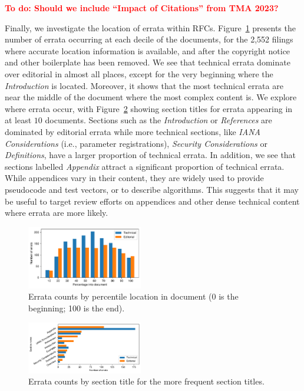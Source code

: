 \documentclass[twocolumn,10pt]{article}
\newcommand{\todo}[1]{\textbf{\textcolor{red}{To do: #1}}}
\newcommand{\pb}[1]{\vspace{0.75ex}\noindent{\textbf{#1}}}
\begin{document}
\todo{Should we include ``Impact of Citations'' from TMA 2023?}

\pb{Errata Location:}
Finally, we investigate the location of errata within RFCs.
Figure~\ref{fig:errata_location_percent_count} presents the number of
errata occurring at each decile of the documents, for the 2,552 filings
where accurate location information is available, and after the copyright
notice and other boilerplate has been removed.  We see that technical
errata dominate over editorial in almost all places, except for the very
beginning where the \textit{Introduction} is located. Moreover, it shows
that the most technical errata are near the middle of the document where
the most complex content is.  We explore where errata occur, with
Figure~\ref{fig:errata_section_wise_counts} showing section titles for
errata appearing in at least $10$ documents. Sections such as the
\emph{Introduction} or \textit{References} are dominated by editorial
errata while more technical sections, like \emph{IANA Considerations} (i.e.,
parameter registrations), \emph{Security Considerations} or
\emph{Definitions}, have a larger proportion of technical errata. In
addition, we see that sections labelled \emph{Appendix} attract a
significant proportion of technical errata. While appendices vary in their
content, they are widely used to provide pseudocode and test vectors, or to
describe algorithms. This suggests that it may be useful to target review
efforts on appendices and other dense technical content where errata are
more likely.

\begin{figure}
\includegraphics[width=0.45\textwidth]{figures-prev/tma-2023/location-percent.pdf}
\caption{Errata counts by percentile location in document (0 is the beginning; 100 is the end).}
\label{fig:errata_location_percent_count}
\end{figure}

\begin{figure}
\includegraphics[width=0.45\textwidth]{figures-prev/tma-2023/section-title-counts.pdf}
\caption{Errata counts by section title for the more frequent section titles.}
\label{fig:errata_section_wise_counts}
\end{figure}
\end{document}
